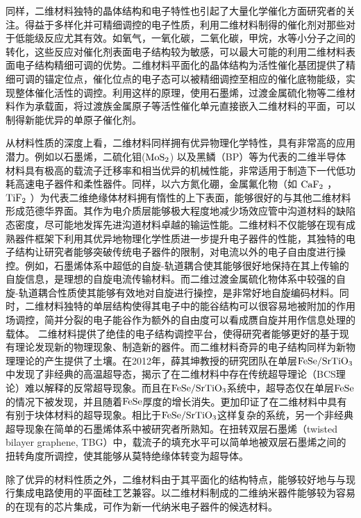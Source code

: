 同样，二维材料独特的晶体结构和电子特性也引起了大量化学催化方面研究者的关注。得益于多样化并可精细调控的电子性质，利用二维材料制得的催化剂对那些对于低能级反应尤其有效。如氧气，一氧化碳，二氧化碳，甲烷，水等小分子之间的转化，这些反应对催化剂表面电子结构较为敏感，可以最大可能的利用二维材料表面电子结构精细可调的优势。二维材料平面化的晶体结构为活性催化基团提供了精细可调的锚定位点，催化位点的电子态可以被精细调控至相应的催化底物能级，实现整体催化活性的调控。利用这样的原理，使用石墨烯，过渡金属硫化物等二维材料作为承载面，将过渡族金属原子等活性催化单元直接嵌入二维材料的平面，可以制得新能优异的单原子催化剂。

从材料性质的深度上看，二维材料同样拥有优异物理化学特性，具有非常高的应用潜力。例如以石墨烯，二硫化钼($\rm{MoS_{2}}$) 以及黑鳞（BP）等为代表的二维半导体材料具有极高的载流子迁移率和相当优异的机械性能，非常适用于制造下一代低功耗高速电子器件和柔性器件。同样，以六方氮化硼，金属氟化物（如 $\rm{CaF_{2}}$ ， $\rm{TiF_{2}}$ ）为代表二维绝缘体材料拥有惰性的上下表面，能够很好的与其他二维材料形成范德华界面。其作为电介质层能够极大程度地减少场效应管中沟道材料的缺陷态密度，尽可能地发挥先进沟道材料卓越的输运性能。二维材料不仅能够在现有成熟器件框架下利用其优异地物理化学性质进一步提升电子器件的性能，其独特的电子结构让研究者能够突破传统电子器件的限制，对电流以外的电子自由度进行操控。例如，石墨烯体系中超低的自旋-轨道耦合使其能够很好地保持在其上传输的自旋信息，是理想的自旋电流传输材料。而二维过渡金属硫化物体系中较强的自旋-轨道耦合性质使其能够有效地对自旋进行操控，是非常好地自旋编码材料。同时，二维材料独特的单层结构使得其电子中的能谷结构可以很容易地被附加的作用场调控，简并分裂的电子能谷作为额外的自由度可以看成赝自旋并用作信息处理的载体。
二维材料提供了绝佳的电子结构调控平台，使得研究者能够更好的基于现有理论发现新的物理现象、制造新的器件。而二维材料奇异的电子结构同样为新物理理论的产生提供了土壤。在2012年，薛其坤教授的研究团队在单层$\rm{FeSe/SrTiO_{3}}$中发现了非经典的高温超导态，揭示了在二维材料中存在传统超导理论（BCS理论）难以解释的反常超导现象。而且在$\rm{FeSe/SrTiO_{3}}$系统中，超导态仅在单层$\rm{FeSe}$的情况下被发现，并且随着$\rm{FeSe}$厚度的增长消失。更加印证了在二维材料中具有有别于块体材料的超导现象。相比于$\rm{FeSe/SrTiO_{3}}$这样复杂的系统，另一个非经典超导现象在简单的石墨烯体系中被研究者所熟知。在扭转双层石墨烯（twisted bilayer graphene, TBG）中，载流子的填充水平可以简单地被双层石墨烯之间的扭转角度所调控，使其能够从莫特绝缘体转变为超导体。


除了优异的材料性质之外，二维材料由于其平面化的结构特点，能够较好地与与现行集成电路使用的平面硅工艺兼容。以二维材料制成的二维纳米器件能够较为容易的在现有的芯片集成，可作为新一代纳米电子器件的候选材料。

